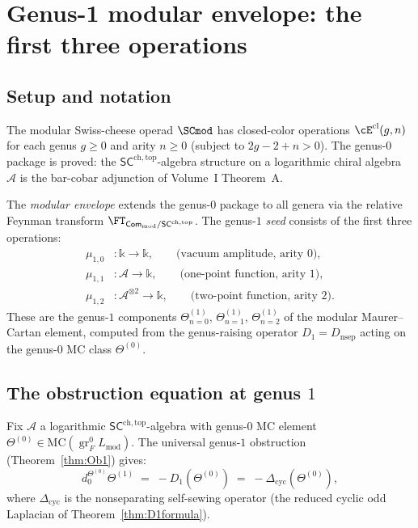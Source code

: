 \documentclass[11pt]{article}
\newcommand{\cA}{\mathcal{A}}
\newcommand{\Com}{\mathsf{Com}}
\newcommand{\SCchtop}{\mathsf{SC}^{\mathrm{ch,top}}}
\newcommand{\MC}{\mathrm{MC}}
\DeclareMathOperator{\gr}{gr}
\begin{document}

\section{Genus-1 modular envelope: the first three operations}
\label{sec:genus1-modular-envelope}

\subsection{Setup and notation}

The modular Swiss-cheese operad $\SCmod$ has closed-color operations
$\cE^{\mathrm{cl}}(g,n)$ for each genus $g \geq 0$ and arity $n \geq 0$
(subject to $2g - 2 + n > 0$).  The genus-$0$ package is proved: the
$\SCchtop$-algebra structure on a logarithmic chiral algebra $\cA$ is
the bar-cobar adjunction of Volume~I Theorem~A.

The \emph{modular envelope} extends the genus-$0$ package to all genera
via the relative Feynman transform $\FT_{\Com_{\mathrm{mod}}/\SCchtop}$.
The genus-$1$ \emph{seed} consists of the first three operations:
\begin{align*}
\mu_{1,0} &\colon \mathbb{k} \longrightarrow \mathbb{k},
\qquad\text{(vacuum amplitude, arity $0$)},\\
\mu_{1,1} &\colon \cA \longrightarrow \mathbb{k},
\qquad\text{(one-point function, arity $1$)},\\
\mu_{1,2} &\colon \cA^{\otimes 2} \longrightarrow \mathbb{k},
\qquad\text{(two-point function, arity $2$)}.
\end{align*}
These are the genus-$1$ components $\Theta^{(1)}_{n=0}$,
$\Theta^{(1)}_{n=1}$, $\Theta^{(1)}_{n=2}$ of the modular
Maurer--Cartan element, computed from the genus-raising operator
$D_1 = D_{\mathrm{nsep}}$ acting on the genus-$0$ MC class
$\Theta^{(0)}$.

\subsection{The obstruction equation at genus $1$}

Fix $\cA$ a logarithmic $\SCchtop$-algebra with genus-$0$ MC
element $\Theta^{(0)} \in \MC(\gr_F^0 L_{\mathrm{mod}})$.  The
universal genus-$1$ obstruction (Theorem~\ref{thm:Ob1}) gives:
\begin{equation}\label{eq:wn-genus1-obstruction}
d_0^{\Theta^{(0)}} \Theta^{(1)}
\;=\;
-D_1(\Theta^{(0)})
\;=\;
-\Delta_{\mathrm{cyc}}(\Theta^{(0)}),
\end{equation}
where $\Delta_{\mathrm{cyc}}$ is the nonseparating self-sewing
operator (the reduced cyclic odd Laplacian of
Theorem~\ref{thm:D1formula}).
\end{document}
